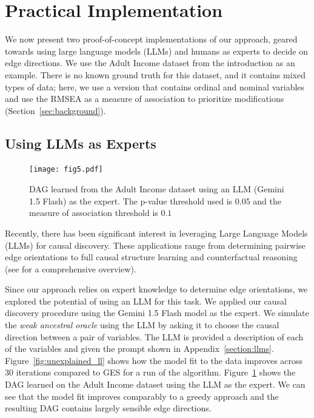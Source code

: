 \documentclass{uai2025} %
\begin{document}
\section{Practical Implementation}

\label{sec:web}

We now present two proof-of-concept implementations of our approach, 
geared towards using  large language models (LLMs) and humans as experts
to decide on edge directions. We use the Adult Income dataset from the 
introduction as an example. There is no known ground truth for this dataset,
and it contains mixed types of data; here, we use a version that contains
ordinal and nominal variables and use the RMSEA as a measure of association
to prioritize modifications (Section~\ref{sec:background}). 

\subsection{Using LLMs as Experts}
 
\begin{figure}[t!]
	\centering
	\texttt{[image: fig5.pdf]}
	\caption{DAG learned from the Adult Income dataset using an LLM
		(Gemini 1.5 Flash) as the expert. The p-value threshold used is $ 0.05 $ 
		and the measure of association threshold is $ 0. 1 $}
	\label{fig:adult_llm}
\end{figure}

Recently, there has been significant interest in leveraging Large Language
Models (LLMs) for causal discovery. These applications range from determining
pairwise edge orientations \citep{Kiciman2023, Jin2024} to full causal
structure learning \citep{Naik2023, Vashishtha2023} and counterfactual
reasoning \citep{Kiciman2023} (see \citet{Liu2024} for a comprehensive
overview).

Since our approach relies on expert knowledge to determine edge orientations,
we explored the potential of using an LLM for this task. We applied our causal
discovery procedure using the Gemini 1.5 Flash model as the expert. We simulate
the \emph{weak ancestral oracle} using the LLM by asking it to choose the
causal direction between a pair of variables. The LLM is provided a description
of each of the variables and given the prompt shown in
Appendix~\ref{section:llms}. 
Figure~\ref{fig:unexplained_ll} shows how the model fit to the data improves 
across 30 iterations compared to GES for a run of the algorithm.
Figure~\ref{fig:adult_llm} shows the DAG learned
on the Adult Income dataset using the LLM as the expert. We can see 
that the model fit improves comparably to a greedy approach and 
the resulting DAG contains largely sensible edge directions. 
\end{document}
